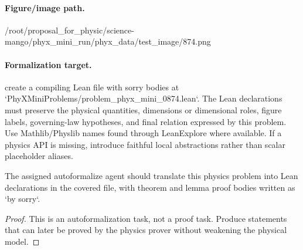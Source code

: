 \paragraph{Figure/image path.}
/root/proposal\_for\_physic/science-mango/phyx\_mini\_run/phyx\_data/test\_image/874.png

\paragraph{Formalization target.}
create a compiling Lean file with sorry bodies at `PhyXMiniProblems/problem\_phyx\_mini\_0874.lean`. The Lean declarations must preserve the physical quantities, dimensions or dimensional roles, figure labels, governing-law hypotheses, and final relation expressed by this problem.
Use Mathlib/Physlib names found through LeanExplore where available. If a physics API is missing, introduce faithful local abstractions rather than scalar placeholder aliases.

\begin{theorem}
\label{thm:physics:phyx_mini_0874:target}
The assigned autoformalize agent should translate this physics problem into Lean declarations in the covered file, with theorem and lemma proof bodies written as `by sorry`.
\end{theorem}
\begin{proof}
This is an autoformalization task, not a proof task. Produce statements that can later be proved by the physics prover without weakening the physical model.
\end{proof}


